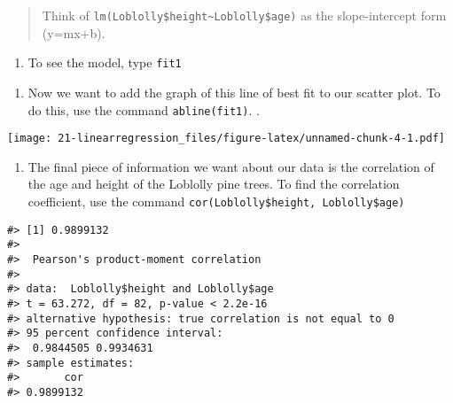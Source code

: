 \documentclass[
]{book}
\newenvironment{Shaded}{\begin{snugshade}}{\end{snugshade}}
\newcommand{\CommentTok}[1]{\textcolor[rgb]{0.56,0.35,0.01}{\textit{#1}}}
\newcommand{\FunctionTok}[1]{\textcolor[rgb]{0.00,0.00,0.00}{#1}}
\newcommand{\NormalTok}[1]{#1}
\newcommand{\OtherTok}[1]{\textcolor[rgb]{0.56,0.35,0.01}{#1}}
\newcommand{\SpecialCharTok}[1]{\textcolor[rgb]{0.00,0.00,0.00}{#1}}
\providecommand{\tightlist}{%
  \setlength{\itemsep}{0pt}\setlength{\parskip}{0pt}}
\begin{document}
\begin{quote}
Think of \texttt{lm(Loblolly\$height\textasciitilde{}Loblolly\$age)} as the slope-intercept form (y=mx+b).
\end{quote}

\begin{enumerate}
\def\labelenumi{\arabic{enumi}.}
\setcounter{enumi}{3}
\tightlist
\item
  To see the model, type \texttt{fit1}
\end{enumerate}

\begin{Shaded}
\end{Shaded}

\begin{enumerate}
\def\labelenumi{\arabic{enumi}.}
\setcounter{enumi}{4}
\tightlist
\item
  Now we want to add the graph of this line of best fit to our scatter plot. To do this, use the
  command \texttt{abline(fit1)}. .
\end{enumerate}

\texttt{[image: 21-linearregression\_files/figure-latex/unnamed-chunk-4-1.pdf]}

\begin{enumerate}
\def\labelenumi{\arabic{enumi}.}
\setcounter{enumi}{8}
\tightlist
\item
  The final piece of information we want about our data is the correlation of the age and height
  of the Loblolly pine trees. To find the correlation coefficient, use the command \texttt{cor(Loblolly\$height,\ Loblolly\$age)}
\end{enumerate}

\begin{verbatim}
#> [1] 0.9899132
#> 
#>  Pearson's product-moment correlation
#> 
#> data:  Loblolly$height and Loblolly$age
#> t = 63.272, df = 82, p-value < 2.2e-16
#> alternative hypothesis: true correlation is not equal to 0
#> 95 percent confidence interval:
#>  0.9844505 0.9934631
#> sample estimates:
#>       cor 
#> 0.9899132
\end{verbatim}
\end{document}
